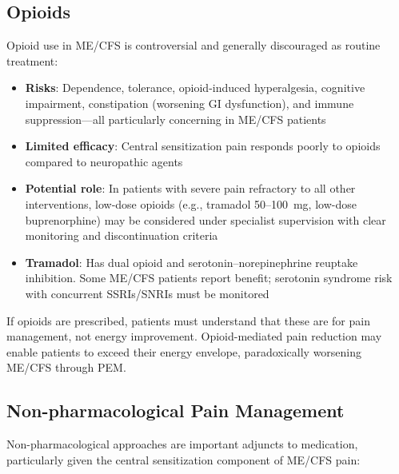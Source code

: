 \subsection{Opioids}

Opioid use in ME/CFS is controversial and generally discouraged as routine treatment:

\begin{itemize}
    \item \textbf{Risks}: Dependence, tolerance, opioid-induced hyperalgesia, cognitive impairment, constipation (worsening GI dysfunction), and immune suppression---all particularly concerning in ME/CFS patients
    \item \textbf{Limited efficacy}: Central sensitization pain responds poorly to opioids compared to neuropathic agents
    \item \textbf{Potential role}: In patients with severe pain refractory to all other interventions, low-dose opioids (e.g., tramadol 50--100~mg, low-dose buprenorphine) may be considered under specialist supervision with clear monitoring and discontinuation criteria
    \item \textbf{Tramadol}: Has dual opioid and serotonin--norepinephrine reuptake inhibition. Some ME/CFS patients report benefit; serotonin syndrome risk with concurrent SSRIs/SNRIs must be monitored
\end{itemize}

\begin{warning}
If opioids are prescribed, patients must understand that these are for pain management, not energy improvement. Opioid-mediated pain reduction may enable patients to exceed their energy envelope, paradoxically worsening ME/CFS through PEM.
\end{warning}

\subsection{Non-pharmacological Pain Management}

Non-pharmacological approaches are important adjuncts to medication, particularly given the central sensitization component of ME/CFS pain:

